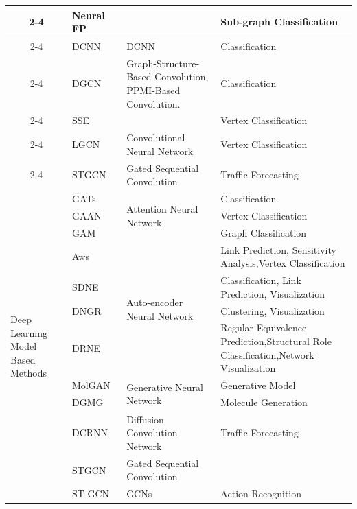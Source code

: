 \begin{table}[htbp]
\begin{tabular}{clll}
\cmidrule{2-4}          & \multicolumn{1}{p{11.5em}}{Neural FP~} &       & Sub-graph Classification \\
\cmidrule{2-4}          & DCNN~ & DCNN  & Classification \\
\cmidrule{2-4}          & DGCN~ & \multicolumn{1}{p{11.5em}}{Graph-Structure-Based Convolution, PPMI-Based Convolution.} & Classification \\
\cmidrule{2-4}          & SSE~ &       & Vertex Classification \\
\cmidrule{2-4}          & LGCN~ & Convolutional Neural Network & Vertex Classification \\
\cmidrule{2-4}          & STGCN~ & Gated Sequential Convolution & Traffic Forecasting \\
    \midrule
    \multicolumn{1}{l}{\multirow{12}[24]{*}{Deep Learning\newline{}  Model Based Methods}} & GATs~ & \multicolumn{1}{l}{\multirow{3}[6]{*}{Attention Neural Network}} & Classification \\
\cmidrule{2-2}\cmidrule{4-4}          & GAAN~ &       & Vertex Classification \\
\cmidrule{2-2}\cmidrule{4-4}          & GAM~ &       & Graph Classification \\
\cmidrule{2-4}          & Aws~ & \multicolumn{1}{l}{\multirow{4}[8]{*}{Auto-encoder Neural Network}} & \multicolumn{1}{p{11.94em}}{Link Prediction,  \newline{}Sensitivity Analysis,\newline{}Vertex Classification} \\
\cmidrule{2-2}\cmidrule{4-4}          & SDNE~ &       & \multicolumn{1}{p{11.94em}}{Classification,\newline{} Link Prediction, \newline{}Visualization} \\
\cmidrule{2-2}\cmidrule{4-4}          & DNGR~  &       & Clustering, Visualization \\
\cmidrule{2-2}\cmidrule{4-4}          & DRNE~&       & \multicolumn{1}{p{11.94em}}{Regular Equivalence Prediction,\newline{}Structural Role Classification,\newline{}Network Visualization} \\
\cmidrule{2-4}          & MolGAN~  & \multicolumn{1}{l}{\multirow{2}[4]{*}{Generative Neural Network}} & Generative Model \\
\cmidrule{2-2}\cmidrule{4-4}          & DGMG~ &       &  Molecule Generation \\
\cmidrule{2-4}          & DCRNN~ & Diffusion Convolution Network & Traffic Forecasting \\
\cmidrule{2-4}          & STGCN~ & Gated Sequential Convolution &  \\
\cmidrule{2-4}          & ST-GCN~ & GCNs  & Action Recognition \\
    \bottomrule
    \end{tabular}
  \label{tab:addlabel}
\end{table}

